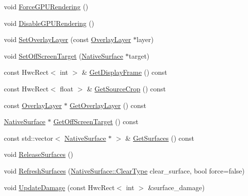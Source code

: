 \begin{DoxyCompactItemize}
void \mbox{\hyperlink{classhwcomposer_1_1DisplayPlaneState_a6caea69cc46139ce6548ff2b029acbb0}{Force\+G\+P\+U\+Rendering}} ()
\item 
void \mbox{\hyperlink{classhwcomposer_1_1DisplayPlaneState_a2da76e8aad6edf53502f2ca68030edf4}{Disable\+G\+P\+U\+Rendering}} ()
\item 
void \mbox{\hyperlink{classhwcomposer_1_1DisplayPlaneState_aeb81a113ccac011bf1b26d1850307220}{Set\+Overlay\+Layer}} (const \mbox{\hyperlink{structhwcomposer_1_1OverlayLayer}{Overlay\+Layer}} $\ast$layer)
\item 
void \mbox{\hyperlink{classhwcomposer_1_1DisplayPlaneState_aa0aa12bd8efdabce1acd003eae3f77aa}{Set\+Off\+Screen\+Target}} (\mbox{\hyperlink{classhwcomposer_1_1NativeSurface}{Native\+Surface}} $\ast$target)
\item 
const Hwc\+Rect$<$ int $>$ \& \mbox{\hyperlink{classhwcomposer_1_1DisplayPlaneState_ab25f0fdaa944c5d4e4381f0b16f5fe5f}{Get\+Display\+Frame}} () const
\item 
const Hwc\+Rect$<$ float $>$ \& \mbox{\hyperlink{classhwcomposer_1_1DisplayPlaneState_afc3838db64b5f6b368056c2d752540ee}{Get\+Source\+Crop}} () const
\item 
const \mbox{\hyperlink{structhwcomposer_1_1OverlayLayer}{Overlay\+Layer}} $\ast$ \mbox{\hyperlink{classhwcomposer_1_1DisplayPlaneState_ac2efa7f10a97d64c9bcb8a41c49366ba}{Get\+Overlay\+Layer}} () const
\item 
\mbox{\hyperlink{classhwcomposer_1_1NativeSurface}{Native\+Surface}} $\ast$ \mbox{\hyperlink{classhwcomposer_1_1DisplayPlaneState_a1f7fe7a4a76b65cf04dbbde8ecaf6efa}{Get\+Off\+Screen\+Target}} () const
\item 
const std\+::vector$<$ \mbox{\hyperlink{classhwcomposer_1_1NativeSurface}{Native\+Surface}} $\ast$ $>$ \& \mbox{\hyperlink{classhwcomposer_1_1DisplayPlaneState_a8b725592feb3ae11620bfce898c4d5be}{Get\+Surfaces}} () const
\item 
void \mbox{\hyperlink{classhwcomposer_1_1DisplayPlaneState_a10c469b7a0d06ffe86bfdbd211cc7c1a}{Release\+Surfaces}} ()
\item 
void \mbox{\hyperlink{classhwcomposer_1_1DisplayPlaneState_a53b2ef41b70c5339e691eb43afc5ff92}{Refresh\+Surfaces}} (\mbox{\hyperlink{classhwcomposer_1_1NativeSurface_a0d0f955fc1e9f95c9684e9524f4217d6}{Native\+Surface\+::\+Clear\+Type}} clear\+\_\+surface, bool force=false)
\item 
void \mbox{\hyperlink{classhwcomposer_1_1DisplayPlaneState_a49ce8c1f129155876a310a60a8609fae}{Update\+Damage}} (const Hwc\+Rect$<$ int $>$ \&surface\+\_\+damage)

\end{DoxyCompactItemize}
